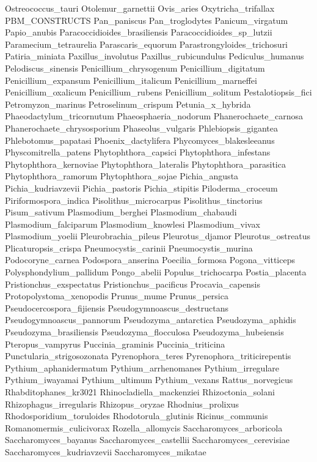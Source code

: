 \documentclass[letterpaper,10pt,english]{sphinxmanual}
\begin{document}
{\begin{sphinxVerbatim}[commandchars=\\\{\}]
Ostreococcus\_tauri
Otolemur\_garnettii
Ovis\_aries
Oxytricha\_trifallax
PBM\_CONSTRUCTS
Pan\_paniscus
Pan\_troglodytes
Panicum\_virgatum
Papio\_anubis
Paracoccidioides\_brasiliensis
Paracoccidioides\_sp\_lutzii
Paramecium\_tetraurelia
Parascaris\_equorum
Parastrongyloides\_trichosuri
Patiria\_miniata
Paxillus\_involutus
Paxillus\_rubicundulus
Pediculus\_humanus
Pelodiscus\_sinensis
Penicillium\_chrysogenum
Penicillium\_digitatum
Penicillium\_expansum
Penicillium\_italicum
Penicillium\_marneffei
Penicillium\_oxalicum
Penicillium\_rubens
Penicillium\_solitum
Pestalotiopsis\_fici
Petromyzon\_marinus
Petroselinum\_crispum
Petunia\_x\_hybrida
Phaeodactylum\_tricornutum
Phaeosphaeria\_nodorum
Phanerochaete\_carnosa
Phanerochaete\_chrysosporium
Phaseolus\_vulgaris
Phlebiopsis\_gigantea
Phlebotomus\_papatasi
Phoenix\_dactylifera
Phycomyces\_blakesleeanus
Physcomitrella\_patens
Phytophthora\_capsici
Phytophthora\_infestans
Phytophthora\_kernoviae
Phytophthora\_lateralis
Phytophthora\_parasitica
Phytophthora\_ramorum
Phytophthora\_sojae
Pichia\_angusta
Pichia\_kudriavzevii
Pichia\_pastoris
Pichia\_stipitis
Piloderma\_croceum
Piriformospora\_indica
Pisolithus\_microcarpus
Pisolithus\_tinctorius
Pisum\_sativum
Plasmodium\_berghei
Plasmodium\_chabaudi
Plasmodium\_falciparum
Plasmodium\_knowlesi
Plasmodium\_vivax
Plasmodium\_yoelii
Pleurobrachia\_pileus
Pleurotus\_djamor
Pleurotus\_ostreatus
Plicaturopsis\_crispa
Pneumocystis\_carinii
Pneumocystis\_murina
Podocoryne\_carnea
Podospora\_anserina
Poecilia\_formosa
Pogona\_vitticeps
Polysphondylium\_pallidum
Pongo\_abelii
Populus\_trichocarpa
Postia\_placenta
Pristionchus\_exspectatus
Pristionchus\_pacificus
Procavia\_capensis
Protopolystoma\_xenopodis
Prunus\_mume
Prunus\_persica
Pseudocercospora\_fijiensis
Pseudogymnoascus\_destructans
Pseudogymnoascus\_pannorum
Pseudozyma\_antarctica
Pseudozyma\_aphidis
Pseudozyma\_brasiliensis
Pseudozyma\_flocculosa
Pseudozyma\_hubeiensis
Pteropus\_vampyrus
Puccinia\_graminis
Puccinia\_triticina
Punctularia\_strigosozonata
Pyrenophora\_teres
Pyrenophora\_triticirepentis
Pythium\_aphanidermatum
Pythium\_arrhenomanes
Pythium\_irregulare
Pythium\_iwayamai
Pythium\_ultimum
Pythium\_vexans
Rattus\_norvegicus
Rhabditophanes\_kr3021
Rhinocladiella\_mackenziei
Rhizoctonia\_solani
Rhizophagus\_irregularis
Rhizopus\_oryzae
Rhodnius\_prolixus
Rhodosporidium\_toruloides
Rhodotorula\_glutinis
Ricinus\_communis
Romanomermis\_culicivorax
Rozella\_allomycis
Saccharomyces\_arboricola
Saccharomyces\_bayanus
Saccharomyces\_castellii
Saccharomyces\_cerevisiae
Saccharomyces\_kudriavzevii
Saccharomyces\_mikatae

\end{sphinxVerbatim}}
\end{document}
